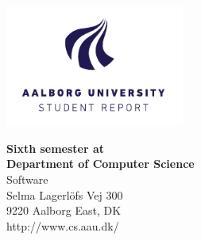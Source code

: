 

{}
\thispagestyle{empty}

\begin{minipage}[t]{0.48\textwidth}
\vspace*{-25pt}			%
\includegraphics[height=4cm]{billeder/AAU-logo-stud-UK-RGB}
\end{minipage}
\hfill
\begin{minipage}[t]{0.48\textwidth}
{\small 
\textbf{Sixth semester at}\\
\textbf{Department of Computer Science}  \\
Software \\
Selma Lagerlöfs Vej 300 \\
9220 Aalborg East, DK \\
http://www.cs.aau.dk/}
\end{minipage}

\vspace*{1cm}

